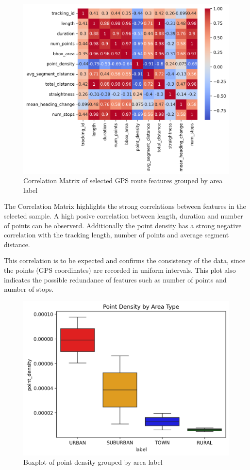 \documentclass[a4paper,12pt,twoside]{scrreprt}
\begin{document}
\begin{figure}[htbp]
  \centering
  \includegraphics[width=\textwidth]{Figures/sample_correlation_matrix.png}
  \caption{Correlation Matrix of selected GPS route features grouped by area
    label}
  \label{fig:sample_correlation_matrix}
\end{figure}
\FloatBarrier

The Correlation Matrix highlights the strong correlations between features in
the selected sample.
A high posive correlation between length, duration and number of points can be
observerd. Additionally the point density has a strong negative correlation
with the tracking length, number of points and average segment distance.

This correlation is to be expected and confirms the consistency of the data,
since the points (GPS coordinates) are recorded in uniform intervals. This plot
also indicates the possible redundance of features such as number of points and
number of stops.

\begin{figure}[h]
  \centering

  \includegraphics[width=\textwidth]{Figures/sample_point_density_boxplot.png}
  \caption{Boxplot of point density grouped by area label}
  \label{fig:sample_boxplot}
\end{figure}
\FloatBarrier
\end{document}

